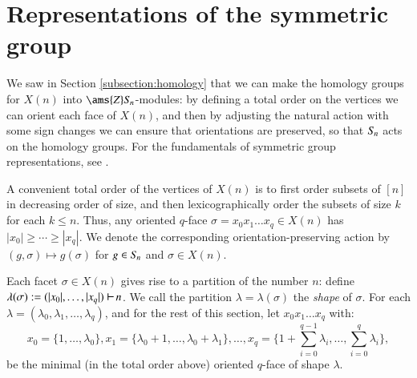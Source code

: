 \documentclass[matann2]{svjour1}
\def\Z{\ams{Z}}
\def\symn{S_{\kern-1pt n}}
\def\ss{\sigma}
\def\partition{\,\,\begin{tikzpicture}
\draw[line width=0.7pt](0,0)--(0,0.2);
\draw[line width=0.7pt](0,0.1)--(0.175,0.1);
\end{tikzpicture}\,}
\newcommand{\Sym}[1]{S_{\kern-1pt {#1}}}
\begin{document}

\section{Representations of the symmetric group}
\label{section:representations}

%
%
% 

We saw in Section \ref{subsection:homology} that we can make the 
homology groups for $X(n)$ into $\Z\symn$-modules: by defining a total 
order on the vertices we can orient each face of $X(n)$, and then by 
adjusting the natural action with some sign changes we can ensure that 
orientations are preserved, so that $\symn$ acts on the homology
groups.
For the fundamentals of symmetric group representations, see
\cite{MR1824028}.

A convenient total order of the vertices of $X(n)$ is to first order 
subsets of $[n]$ in decreasing order of size, and then lexicographically 
order the subsets of size $k$ for each $k\leq n$. 
Thus, any oriented $q$-face $\ss=x_0x_1\ldots x_q \in X(n)$ has 
$|x_0|\geq \cdots \geq |x_q|$.
We denote the corresponding orientation-preserving action by 
$(g,\sigma) \mapsto g(\sigma)$ for $g\in \symn$ and $\sigma\in X(n)$.

Each facet $\sigma\in X(n)$ gives rise to a partition of the 
number $n$: define $\lambda(\sigma):=(|x_0|,\ldots,|x_q|)\partition n$.
We call the partition $\lambda=\lambda(\sigma)$ the \emph{shape} of
$\sigma$. 
For each $\lambda=(\lambda_0,\lambda_1,\ldots,\lambda_q)$, and for 
the rest of
this section,
let $x_0x_1\ldots x_q$ with:
\begin{equation}\label{min_face}
    x_0=\{1,\ldots,\lambda_0\},
x_1=\{\lambda_0+1,\ldots,\lambda_0+\lambda_1\},
\ldots,
x_q=\biggl\{1+\sum_{i=0}^{q-1}\lambda_i,
\ldots,\sum_{i=0}^{q}\lambda_i\biggr\},
\end{equation}
be the minimal (in the total order above) 
  oriented $q$-face of 
shape $\lambda$.
\end{document}
